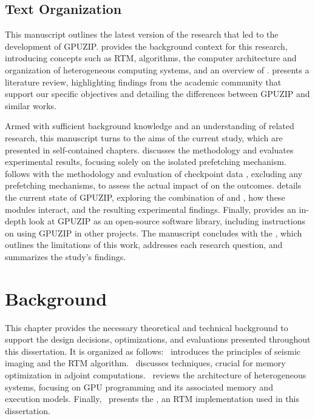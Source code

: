 \documentclass[Ingles,Final]{ic-tese-v3}
\begin{document}
\section{Text Organization}
This manuscript outlines the latest version of the research that led to the development of GPUZIP.  provides the background context for this research, introducing concepts such as RTM, \checkpointing algorithms, the computer architecture and organization of heterogeneous computing systems, and an overview of \awave.  presents a literature review, highlighting findings from the academic community that support our specific objectives and detailing the differences between GPUZIP and similar works.

Armed with sufficient background knowledge and an understanding of related research, this manuscript turns to the aims of the current study, which are presented in self-contained chapters.  discusses the \checkpointprefetching methodology and evaluates experimental results, focusing solely on the isolated prefetching mechanism.  follows with the methodology and evaluation of checkpoint data \compression, excluding any prefetching mechanisms, to assess the actual impact of \compression on the outcomes.  details the current state of GPUZIP, exploring the combination of \prefetching and \compression, how these modules interact, and the resulting experimental findings. Finally,  provides an in-depth look at GPUZIP as an open-source software library, including instructions on using GPUZIP in other projects. The manuscript concludes with the , which outlines the limitations of this work, addresses each research question, and summarizes the study's findings.

\chapter {Background}
\label{ch:background}

This chapter provides the necessary theoretical and technical background to support the design decisions, optimizations, and evaluations presented throughout this dissertation. It is organized as follows:~ introduces the principles of seismic imaging and the RTM algorithm.~ discusses \checkpointing techniques, crucial for memory optimization in adjoint computations.~ reviews the architecture of heterogeneous systems, focusing on GPU programming and its associated memory and execution models. Finally,~ presents the \awave, an RTM implementation used in this dissertation.
\end{document}
